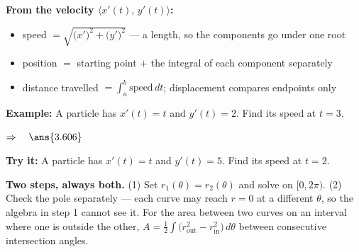 \documentclass[12pt]{article}
\begin{document}


\begin{formulabox}
\textbf{From the velocity $\langle x'(t),\, y'(t)\rangle$:}
\begin{itemize}[leftmargin=1.2cm, itemsep=1pt, topsep=2pt]
  \item speed $= \sqrt{\big(x'\big)^2 + \big(y'\big)^2}$ --- a length, so the components go under one root
  \item position $= $ starting point $+$ the integral of each component separately
  \item distance travelled $= \int_a^b \text{speed}\,dt$; displacement compares endpoints only
\end{itemize}
\end{formulabox}

\begin{examplebox}
\textbf{Example:} \quad A particle has $x'(t) = t$ and $y'(t) = 2$. Find its speed at $t = 3$.

$\Rightarrow\quad \ans{3.606}$
\end{examplebox}

\begin{tryitbox}
\textbf{Try it:} \quad A particle has $x'(t) = t$ and $y'(t) = 5$. Find its speed at $t = 2$.\\[2pt]
\end{tryitbox}


\begin{formulabox}
\textbf{Two steps, always both.} (1) Set $r_1(\theta) = r_2(\theta)$ and solve on $[0, 2\pi)$. (2) Check the pole separately --- each curve may reach $r = 0$ at a different $\theta$, so the algebra in step 1 cannot see it. For the area between two curves on an interval where one is outside the other, $A = \frac{1}{2}\int \big(r_{\text{out}}^2 - r_{\text{in}}^2\big)\,d\theta$ between consecutive intersection angles.
\end{formulabox}
\end{document}
